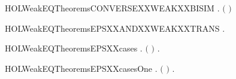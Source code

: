 \newcommand{\HOLWeakEQTheoremsCOMPXXWEAKXXBISIM}{\UseVerbatim{HOLWeakEQTheoremsCOMPXXWEAKXXBISIM}}
\begin{SaveVerbatim}{HOLWeakEQTheoremsCONVERSEXXWEAKXXBISIM}
\HOLTokenTurnstile{} \HOLSymConst{\HOLTokenForall{}}.   \HOLSymConst{\HOLTokenImp{}}  \ensuremath{(} \ensuremath{)}
\end{SaveVerbatim}
\newcommand{\HOLWeakEQTheoremsCONVERSEXXWEAKXXBISIM}{\UseVerbatim{HOLWeakEQTheoremsCONVERSEXXWEAKXXBISIM}}
\begin{SaveVerbatim}{HOLWeakEQTheoremsEPSXXANDXXWEAKXXTRANS}
\HOLTokenTurnstile{} \HOLSymConst{\HOLTokenForall{}}   .    \HOLSymConst{\HOLTokenConj{}}  \HOLTokenWeakTransBegin{}\HOLTokenWeakTransEnd {} \HOLSymConst{\HOLTokenImp{}}  \HOLTokenWeakTransBegin{}\HOLTokenWeakTransEnd {}
\end{SaveVerbatim}
\newcommand{\HOLWeakEQTheoremsEPSXXANDXXWEAKXXTRANS}{\UseVerbatim{HOLWeakEQTheoremsEPSXXANDXXWEAKXXTRANS}}
\begin{SaveVerbatim}{HOLWeakEQTheoremsEPSXXcases}
\HOLTokenTurnstile{} \HOLSymConst{\HOLTokenForall{}} .
          \HOLSymConst{\HOLTokenEquiv{}}
        \HOLTokenTransBegin\HOLConst{\ensuremath{\tau}}\HOLTokenTransEnd {} \HOLSymConst{\HOLTokenDisj{}} \ensuremath{(} \HOLSymConst{\ensuremath{=}} \ensuremath{)} \HOLSymConst{\HOLTokenDisj{}} \HOLSymConst{\HOLTokenExists{}}.    \HOLSymConst{\HOLTokenConj{}}   
\end{SaveVerbatim}
\newcommand{\HOLWeakEQTheoremsEPSXXcases}{\UseVerbatim{HOLWeakEQTheoremsEPSXXcases}}
\begin{SaveVerbatim}{HOLWeakEQTheoremsEPSXXcasesOne}
\HOLTokenTurnstile{} \HOLSymConst{\HOLTokenForall{}} .    \HOLSymConst{\HOLTokenEquiv{}} \ensuremath{(} \HOLSymConst{\ensuremath{=}} \ensuremath{)} \HOLSymConst{\HOLTokenDisj{}} \HOLSymConst{\HOLTokenExists{}}.  \HOLTokenTransBegin\HOLConst{\ensuremath{\tau}}\HOLTokenTransEnd {} \HOLSymConst{\HOLTokenConj{}}   
\end{SaveVerbatim}

